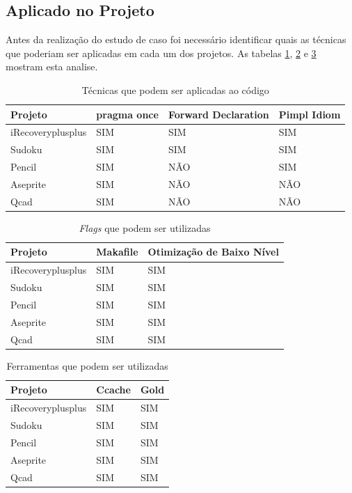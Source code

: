\subsection{Aplicado no Projeto}

Antes da realização do estudo de caso foi necessário identificar quais
 as técnicas que poderiam ser aplicadas em cada um dos projetos.
 As tabelas \ref{tecnicas_que_podem_ser_aplicadas_codigo}, \ref{tecnicas_que_podem_ser_aplicadas_flag} e 
\ref{tecnicas_que_podem_ser_aplicadas_ferramenta} mostram esta analise.


\begin{table}[h]
\centering
\begin{tabular}{llll}
\textbf{Projeto} & \textbf{pragma once} & \textbf{Forward Declaration} & \textbf{Pimpl Idiom}  \\ \toprule 
iRecoveryplusplus & SIM & SIM & SIM  \\ 
Sudoku &  SIM & SIM & SIM  \\ 
Pencil & SIM & NÃO &  SIM \\ 
Aseprite &  SIM & NÃO & NÃO  \\ 
Qcad &  SIM & NÃO & NÃO  \\ \bottomrule
\end{tabular} 
\caption{Técnicas que podem ser aplicadas ao código}
\label{tecnicas_que_podem_ser_aplicadas_codigo}
\end{table}

\begin{table}[h]
\centering
\begin{tabular}{lll}
\textbf{Projeto} & \textbf{Makafile} &  \textbf{Otimização de Baixo Nível} \\ \toprule
iRecoveryplusplus & SIM & SIM\\ 
Sudoku &  SIM & SIM  \\ 
Pencil &  SIM & SIM  \\ 
Aseprite & SIM & SIM  \\ 
Qcad &   SIM & SIM\\ \bottomrule
\end{tabular} 
\caption{\textit{Flags} que podem ser utilizadas}
\label{tecnicas_que_podem_ser_aplicadas_flag}
\end{table}

\begin{table}[h]
\centering
\begin{tabular}{lll}
\textbf{Projeto} &  \textbf{Ccache} & \textbf{Gold} \\ \toprule 
iRecoveryplusplus &  SIM & SIM \\ 
Sudoku            &  SIM & SIM \\ 
Pencil            &  SIM & SIM \\ 
Aseprite          &  SIM & SIM \\ 
Qcad              &  SIM & SIM \\ \bottomrule
\end{tabular} 
\caption{Ferramentas que podem ser utilizadas}
\label{tecnicas_que_podem_ser_aplicadas_ferramenta}
\end{table}


